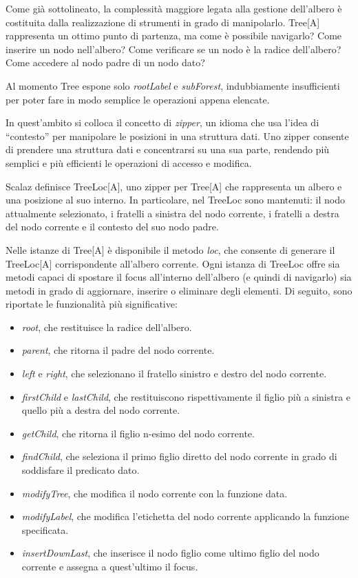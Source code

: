 

Come già sottolineato, la complessità maggiore legata alla gestione dell'albero è costituita dalla realizzazione di strumenti in grado di manipolarlo. Tree[A] rappresenta un ottimo punto di partenza, ma come è possibile navigarlo? Come inserire un nodo nell'albero? Come verificare se un nodo è la radice dell'albero? Come accedere al nodo padre di un nodo dato?

Al momento Tree espone solo \textit{rootLabel} e \textit{subForest}, indubbiamente insufficienti per poter fare in modo semplice le operazioni appena elencate.

In quest'ambito si colloca il concetto di \textit{zipper}, un idioma che usa l'idea di ``contesto'' per manipolare le posizioni in una struttura dati. Uno zipper consente di prendere una struttura dati e concentrarsi su una sua parte, rendendo più semplici e più efficienti le operazioni di accesso e modifica.

Scalaz definisce TreeLoc[A], uno zipper per Tree[A] che rappresenta un albero e una posizione al suo interno. In particolare, nel TreeLoc sono mantenuti: il nodo attualmente selezionato, i fratelli a sinistra del nodo corrente, i fratelli a destra del nodo corrente e il contesto del suo nodo padre.

Nelle istanze di Tree[A] è disponibile il metodo \textit{loc}, che consente di generare il TreeLoc[A] corrispondente all'albero corrente. Ogni istanza di TreeLoc offre sia metodi capaci di spostare il focus all'interno dell'albero (e quindi di navigarlo) sia metodi in grado di aggiornare, inserire o eliminare degli elementi. Di seguito, sono riportate le funzionalità più significative:

\begin{itemize}
\item \textit{root}, che restituisce la radice dell'albero.
\item \textit{parent}, che ritorna il padre del nodo corrente.
\item \textit{left} e \textit{right}, che selezionano il fratello sinistro e destro del nodo corrente.
\item \textit{firstChild} e \textit{lastChild}, che restituiscono rispettivamente il figlio più a sinistra e quello più a destra del nodo corrente.
\item \textit{getChild}, che ritorna il figlio n-esimo del nodo corrente.
\item \textit{findChild}, che seleziona il primo figlio diretto del nodo corrente in grado di soddisfare il predicato dato.
\item \textit{modifyTree}, che modifica il nodo corrente con la funzione data.
\item \textit{modifyLabel}, che modifica l'etichetta del nodo corrente applicando la funzione specificata.
\item \textit{insertDownLast}, che inserisce il nodo figlio come ultimo figlio del nodo corrente e assegna a quest'ultimo il focus.
\end{itemize}

